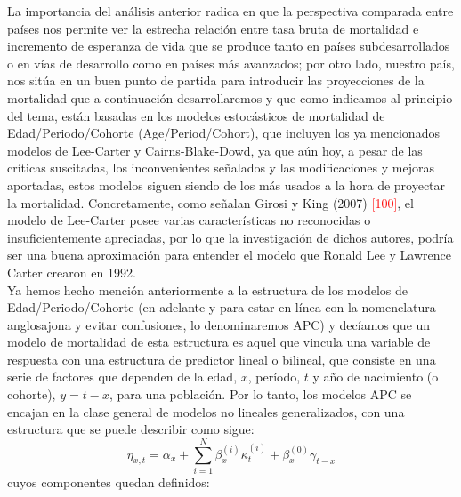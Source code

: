 La importancia del análisis anterior radica en que la perspectiva comparada entre países nos permite ver la estrecha relación entre tasa bruta de mortalidad e incremento de esperanza de vida que se produce tanto en países subdesarrollados o en vías de desarrollo como en países más avanzados; por otro lado, nuestro país, nos sitúa en un buen punto de partida para introducir las proyecciones de la mortalidad que a continuación desarrollaremos y que como indicamos al principio del tema, están basadas en los modelos estocásticos de mortalidad  de \textsc{E}dad/\textsc{P}eriodo/\textsc{C}ohorte (Age/Period/Cohort), que incluyen los ya mencionados modelos de Lee-Carter y Cairns-Blake-Dowd, ya que aún hoy, a pesar de las críticas suscitadas, los inconvenientes señalados y las modificaciones y mejoras aportadas, estos modelos siguen siendo de los más usados a la hora de proyectar la mortalidad. Concretamente, como señalan Girosi y King (2007) \textcolor{red}{[100]}, el modelo de Lee-Carter posee varias características no reconocidas o insuficientemente apreciadas, por lo que la investigación de dichos autores, podría ser una buena aproximación para entender el modelo que Ronald Lee y Lawrence Carter crearon en 1992.\\

Ya hemos hecho mención anteriormente a la estructura de los modelos de \textsc{E}dad/\textsc{P}eriodo/\textsc{C}ohorte (en adelante y para estar en línea con la nomenclatura anglosajona y evitar confusiones, lo denominaremos APC) y decíamos que un modelo de mortalidad de esta estructura es aquel que vincula una variable de respuesta con una estructura de predictor lineal o bilineal, que consiste en una serie de factores que dependen de la edad, $x$, período, $t$ y año de nacimiento (o cohorte), $y = t - x$, para una población. Por lo tanto, los modelos APC se encajan en la clase general de modelos no lineales generalizados, con una estructura que se puede describir como sigue: $$\eta_{x,t}=\alpha_{x}+\sum_{i=1}^{N}\beta_{x}^{(i)}\kappa_{t}^{(i)}+\beta_{x}^{(0)}\gamma_{t-x}$$
cuyos componentes quedan definidos:

